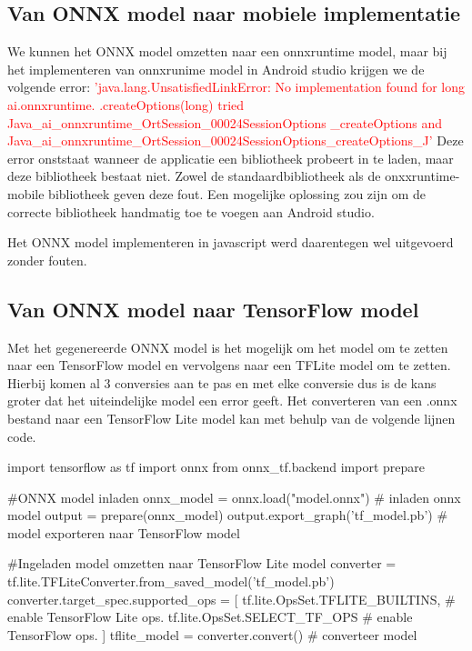 \subsection{Van ONNX model naar mobiele implementatie}
We kunnen het ONNX model omzetten naar een onnxruntime model, maar bij het implementeren van onnxrunime model in Android studio krijgen we de volgende error: \newline
\textcolor{red}{'java.lang.UnsatisfiedLinkError: No implementation found for long ai.onnxruntime.\newline
.createOptions(long) tried Java\_ai\_onnxruntime\_OrtSession\_00024SessionOptions\newline
\_createOptions and Java\_ai\_onnxruntime\_OrtSession\_00024SessionOptions\_createOptions\_J'} \newline
Deze error onststaat wanneer de applicatie een bibliotheek probeert in te laden, maar deze bibliotheek bestaat niet.
Zowel de standaardbibliotheek als de onxxruntime-mobile bibliotheek geven deze fout.
Een mogelijke oplossing zou zijn om de correcte bibliotheek handmatig toe te voegen aan Android studio.

Het ONNX model implementeren in javascript werd daarentegen wel uitgevoerd zonder fouten.

\subsection{Van ONNX model naar TensorFlow model}
Met het gegenereerde ONNX model is het mogelijk om het model om te zetten naar een TensorFlow model en vervolgens naar een TFLite model om te zetten.
Hierbij komen al 3 conversies aan te pas en met elke conversie dus is de kans groter dat het uiteindelijke model een error geeft.
Het converteren van een .onnx bestand naar een TensorFlow Lite model kan met behulp van de volgende lijnen code.

\begin{python}
import tensorflow as tf
import onnx
from onnx_tf.backend import prepare
	
#ONNX model inladen 
onnx_model = onnx.load("model.onnx")  # inladen onnx model
output = prepare(onnx_model)
output.export_graph('tf_model.pb') # model exporteren naar TensorFlow model

#Ingeladen model omzetten naar TensorFlow Lite model
converter = tf.lite.TFLiteConverter.from_saved_model('tf_model.pb')
converter.target_spec.supported_ops = [
	tf.lite.OpsSet.TFLITE_BUILTINS, # enable TensorFlow Lite ops.
	tf.lite.OpsSet.SELECT_TF_OPS # enable TensorFlow ops.
]
tflite_model = converter.convert() # converteer model
\end{python}

